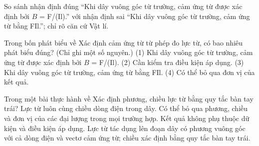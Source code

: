 \begin{bt}
So sánh nhận định đúng “Khi dây vuông góc từ trường, cảm ứng từ được xác định bởi $B$ = F/(Il).” với nhận định sai “Khi dây vuông góc từ trường, cảm ứng từ bằng FIl.”; chỉ rõ căn cứ Vật lí.
\end{bt}

\begin{ex}
Trong bốn phát biểu về Xác định cảm ứng từ từ phép đo lực từ, có bao nhiêu phát biểu đúng? (Chỉ ghi một số nguyên.) (1) Khi dây vuông góc từ trường, cảm ứng từ được xác định bởi $B$ = F/(Il). (2) Cần kiểm tra điều kiện áp dụng. (3) Khi dây vuông góc từ trường, cảm ứng từ bằng FIl. (4) Có thể bỏ qua đơn vị của kết quả.
\end{ex}

\begin{ex}
Trong một bài thực hành về Xác định phương, chiều lực từ bằng quy tắc bàn tay trái?
\choice
{Lực từ luôn cùng chiều dòng điện trong dây.}
{Có thể bỏ qua phương, chiều và đơn vị của các đại lượng trong mọi trường hợp.}
{Kết quả không phụ thuộc dữ kiện và điều kiện áp dụng.}
{\True Lực từ tác dụng lên đoạn dây có phương vuông góc với cả dòng điện và vectơ cảm ứng từ; chiều xác định bằng quy tắc bàn tay trái.}
\end{ex}


